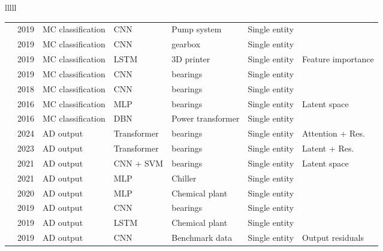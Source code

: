 \begin{landscape}
\begin{longtable}{lllll}
\begin{tabular}{lllllll}
\cite{wangNovelConvolutionalNeural2019} & 2019 & MC classification & CNN & Pump system & Single entity & \texttimes \\
\cite{wuIntelligentFaultDiagnosis2019} & 2019 & MC classification & CNN & gearbox & Single entity & \texttimes \\
\cite{zhangDeepLearningbasedTensile2019} & 2019 & MC classification & LSTM & 3D printer & Single entity & Feature importance \\
\cite{zhaoDeepConvolutionalNeural2019} & 2019 & MC classification & CNN & bearings & Single entity & \texttimes \\
\cite{panLiftingNetNovelDeep2018} & 2018 & MC classification & CNN & bearings & Single entity & \texttimes \\
\cite{jiaDeepNeuralNetworks2016} & 2016 & MC classification & MLP & bearings & Single entity & Latent space \\
\cite{wangTransformerFaultDiagnosis2016} & 2016 & MC classification & DBN & Power transformer & Single entity & \texttimes \\
\cite{zhouFaultFormerPretrainingTransformers2024} & 2024 & AD output & Transformer & bearings & Single entity & Attention + Res. \\
\cite{yangSelfSupervisedLearningSignal2023} & 2023 & AD output & Transformer & bearings & Single entity & Latent + Res. \\
\cite{hanRollingBearingFault2021} & 2021 & AD output & CNN + SVM & bearings & Single entity & Latent space \\
\cite{yanChillerFaultDetection2021} & 2021 & AD output & MLP & Chiller & Single entity & \texttimes \\
\cite{kimSemiSupervisedAutoencoderAuxiliary2020} & 2020 & AD output & MLP & Chemical plant & Single entity & \texttimes \\
\cite{islamAutomatedBearingFault2019} & 2019 & AD output & CNN & bearings & Single entity & \texttimes \\
\cite{morales-foreroCaseStudySemiSupervised2019} & 2019 & AD output & LSTM & Chemical plant & Single entity & \texttimes \\
\cite{munirFuseADUnsupervisedAnomaly2019} & 2019 & AD output & CNN & Benchmark data & Single entity & Output residuals \\
\bottomrule
\end{tabular}

\end{longtable}
\end{landscape}
